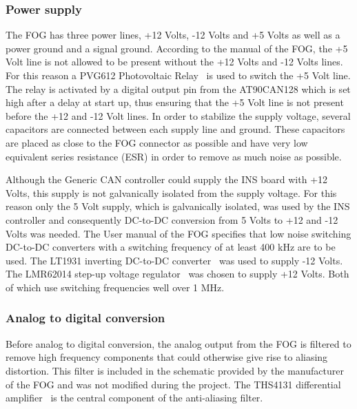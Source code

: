 \subsubsection{Power supply}
The FOG has three power lines, +12 Volts, -12 Volts and +5 Volts as well as a power ground and a signal ground. \newline
According to the manual of the FOG, the +5 Volt line is not allowed to be present without the +12 Volts and -12 Volts lines. For this reason a PVG612 Photovoltaic Relay~\cite{web:pvg612a} is used to switch the +5 Volt line. The relay is activated by a digital output pin from the AT90CAN128 which is set high after a delay at start up, thus ensuring that the +5 Volt line is not present before the +12 and -12 Volt lines. \newline
In order to stabilize the supply voltage, several capacitors are connected between each supply line and ground. These capacitors are placed as close to the FOG connector as possible and have very low equivalent series resistance (ESR) in order to remove as much noise as possible. 

Although the Generic CAN controller could supply the INS board with +12 Volts, this supply is not galvanically isolated from the supply voltage. For this reason only the 5 Volt supply, which is galvanically isolated, was used by the INS controller and consequently DC-to-DC conversion from 5 Volts to +12 and -12 Volts was needed. \newline
The User manual of the FOG specifies that low noise switching DC-to-DC converters with a switching frequency of at least 400 kHz are to be used. The LT1931 inverting DC-to-DC converter~\cite{web:lt1931} was used to supply -12 Volts. The LMR62014 step-up voltage regulator~\cite{web:lmr62014} was chosen to supply +12 Volts. Both of which use switching frequencies well over 1 MHz.


\subsubsection{Analog to digital conversion}
Before analog to digital conversion, the analog output from the FOG is filtered to remove high frequency components that could otherwise give rise to aliasing distortion. This filter is included in the schematic provided by the manufacturer of the FOG and was not modified during the project. \newline
The THS4131 differential amplifier~\cite{web:ths4131} is the central component of the anti-aliasing filter. 

